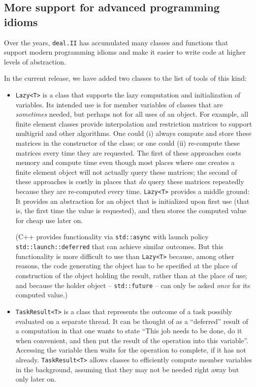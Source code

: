 \documentclass{ansarticle-preprint}
\newcommand{\specialword}[1]{\texttt{#1}}
\newcommand{\dealii}{{\specialword{deal.II}}\xspace}
\begin{document}
\subsection{More support for advanced programming idioms}\label{sec:tools}

Over the years, \dealii{} has accumulated many classes and functions
that support modern programming idioms and make it easier to write
code at higher levels of abstraction.

In the current release, we have added two classes to the list of tools
of this kind:
\begin{itemize}
  \item
  \texttt{Lazy<T>} is a class that supports the lazy computation and
  initialization of variables. Its intended use is for member
  variables of classes that are \emph{sometimes} needed, but perhaps
  not for all uses of an object. For example, all finite element classes
  provide interpolation and restriction matrices to support multigrid
  and other algorithms. One could (i) always compute and store these
  matrices in the constructor of the class; or one could (ii) re-compute these
  matrices every time they are requested. The first of these
  approaches costs memory and compute time even though most places
  where one creates a finite element object will not actually query
  these matrices; the second of these approaches is costly in places
  that \emph{do} query these matrices repeatedly because they are re-computed
  every time. \texttt{Lazy<T>} provides a middle ground: It provides an
  abstraction for an object that is initialized upon first use (that
  is, the first time the value is requested), and then stores the
  computed value for cheap use later on.

  (C++ provides functionality via \texttt{std::async} with
  launch policy \texttt{std::launch::deferred} that can achieve
  similar outcomes. But this functionality is more difficult to use than
  \texttt{Lazy<T>} because, among other reasons, the code generating the
  object has to be specified at the place of construction of the
  object holding the result, rather than at the place of use; and
  because the holder object -- \texttt{std::future} -- can only be
  asked \emph{once} for its computed value.)

  \item \texttt{TaskResult<T>} is a class that represents the outcome
    of a task possibly evaluated on a separate thread. It can be
    thought of as a ``deferred'' result of a computation in that one
    wants to state ``This job needs to be done, do it when convenient,
    and then put the result of the operation into this
    variable''. Accessing the variable then waits for the operation to
    complete, if it has not already. \texttt{TaskResult<T>} allows
    classes to efficiently compute member variables in the background,
    assuming that they may not be needed right away but only later on.


\end{itemize}
\end{document}
